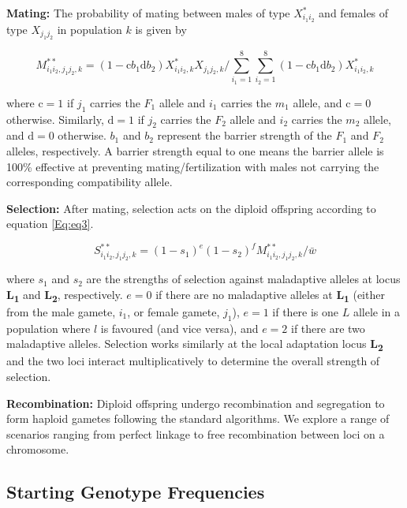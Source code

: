 \documentclass[11pt]{article}
\begin{document}
\noindent \textbf{Mating:} The probability of mating between males of type $X^*_{i_1 i_2}$ and females of type $X_{j_1 j_2}$ in population $k$ is given by

\begin{equation}\label{Eq:eq2}
M^{**}_{i_1 i_2, j_1 j_2, k} = (1 - \text{c} b_1 \text{d} b_2) X^*_{i_1 i_2, k} X_{j_1 j_2, k}/ \sum_{i_1 =1}^{8} \sum_{i_2=1}^{8} (1 - \text{c} b_1 \text{d} b_2) X^*_{i_1 i_2, k}
\end{equation}

where $\text{c} = 1$ if $j_1$ carries the $F_1$ allele and $i_1$ carries the $m_1$ allele, and $\text{c} = 0$ otherwise.  Similarly, $\text{d} = 1$ if $j_2$ carries the $F_2$ allele and $i_2$ carries the $m_2$ allele, and $\text{d} = 0$ otherwise.  $b_1$ and $b_2$ represent the barrier strength of the $F_1$ and $F_2$ alleles, respectively. A barrier strength equal to one means the barrier allele is 100\% effective at preventing mating/fertilization with males not carrying the corresponding compatibility allele.  

\noindent \textbf{Selection:} After mating, selection acts on the diploid offspring according to equation \ref{Eq:eq3}.

\begin{equation}\label{Eq:eq3}
S^{**}_{i_1 i_2, j_1 j_2, k} = (1 - s_1)^{e} (1 - s_2)^{f} M^{**}_{i_1 i_2, j_1 j_2, k}/\bar{w}
\end{equation}

where $s_1$ and $s_2$ are the strengths of selection against maladaptive alleles at locus \textbf{\texorpdfstring{L\textsubscript{1}}{L 1}} and \textbf{\texorpdfstring{L\textsubscript{2}}{L 2}}, respectively.  $e = 0$ if there are no maladaptive alleles at \textbf{\texorpdfstring{L\textsubscript{1}}{L 1}} (either from the male gamete, $i_1$, or female gamete, $j_1$), $e = 1$ if there is one $L$ allele in a population where $l$ is favoured (and vice versa), and $e = 2$ if there are two maladaptive alleles.  Selection works similarly at the local adaptation locus \textbf{\texorpdfstring{L\textsubscript{2}}{L 2}} and the two loci interact multiplicatively to determine the overall strength of selection.

\noindent \textbf{Recombination:} Diploid offspring undergo recombination and segregation to form haploid gametes following the standard algorithms. We explore a range of scenarios ranging from perfect linkage to free recombination between loci on a chromosome. 

\subsection*{Starting Genotype Frequencies} 
\end{document}
